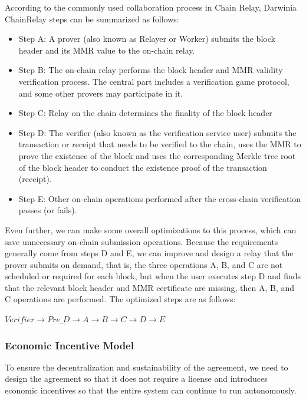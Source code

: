 According to the commonly used collaboration process in Chain Relay, Darwinia ChainRelay steps can be summarized as follows:

\begin{itemize}
    \item Step A: A prover (also known as Relayer or Worker) submits the block header and its MMR value to the on-chain relay.
    \item Step B: The on-chain relay performs the block header and MMR validity verification process. The central part includes a verification game protocol, and some other provers may participate in it.
    \item Step C: Relay on the chain determines the finality of the block header
    \item Step D: The verifier (also known as the verification service user) submits the transaction or receipt that needs to be verified to the chain, uses the MMR to prove the existence of the block and uses the corresponding Merkle tree root of the block header to conduct the existence proof of the transaction (receipt).
    \item Step E: Other on-chain operations performed after the cross-chain verification passes (or fails).
\end{itemize}

Even further, we can make some overall optimizations to this process, which can save unnecessary on-chain submission operations. Because the requirements generally come from steps D and E, we can improve and design a relay that the prover submits on demand, that is, the three operations A, B, and C are not scheduled or required for each block, but when the user executes step D and finds that the relevant block header and MMR certificate are missing, then A, B, and C operations are performed. The optimized steps are as follows:

\begin{center}
    $Verifier \longrightarrow Pre\_D \longrightarrow A \longrightarrow B \longrightarrow C \longrightarrow D \longrightarrow E$
\end{center}

\subsubsection*{Economic Incentive Model}

To ensure the decentralization and sustainability of the agreement, we need to design the agreement so that it does not require a license and introduces economic incentives so that the entire system can continue to run autonomously.

